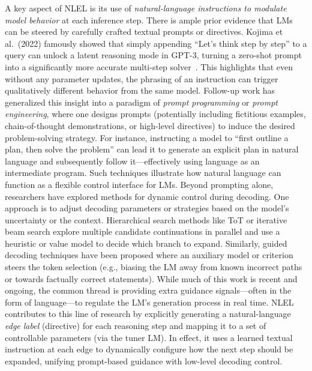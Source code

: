 \documentclass{article}
\theoremstyle{plain}
\theoremstyle{definition}
\theoremstyle{remark}
\begin{document}
A key aspect of NLEL is its use of \emph{natural-language instructions to modulate model behavior} at each inference step. There is ample prior evidence that LMs can be steered by carefully crafted textual prompts or directives. Kojima et al.~(2022) famously showed that simply appending ``Let’s think step by step'' to a query can unlock a latent reasoning mode in GPT-3, turning a zero-shot prompt into a significantly more accurate multi-step solver~\cite{kojima2022letsthink}. This highlights that even without any parameter updates, the phrasing of an instruction can trigger qualitatively different behavior from the same model. Follow-up work has generalized this insight into a paradigm of \emph{prompt programming} or \emph{prompt engineering}, where one designs prompts (potentially including fictitious examples, chain-of-thought demonstrations, or high-level directives) to induce the desired problem-solving strategy. For instance, instructing a model to ``first outline a plan, then solve the problem'' can lead it to generate an explicit plan in natural language and subsequently follow it—effectively using language as an intermediate program. Such techniques illustrate how natural language can function as a flexible control interface for LMs. Beyond prompting alone, researchers have explored methods for dynamic control during decoding. One approach is to adjust decoding parameters or strategies based on the model’s uncertainty or the context. Hierarchical search methods like ToT or iterative beam search explore multiple candidate continuations in parallel and use a heuristic or value model to decide which branch to expand. Similarly, guided decoding techniques have been proposed where an auxiliary model or criterion steers the token selection (e.g., biasing the LM away from known incorrect paths or towards factually correct statements). While much of this work is recent and ongoing, the common thread is providing extra guidance signals—often in the form of language—to regulate the LM’s generation process in real time. NLEL contributes to this line of research by explicitly generating a natural-language \emph{edge label} (directive) for each reasoning step and mapping it to a set of controllable parameters (via the tuner LM). In effect, it uses a learned textual instruction at each edge to dynamically configure how the next step should be expanded, unifying prompt-based guidance with low-level decoding control.
\end{document}
